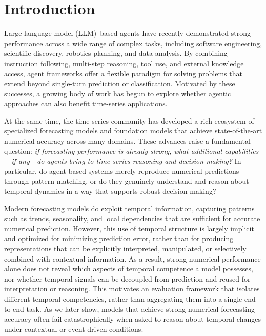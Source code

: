 \section{Introduction}


Large language model (LLM)--based agents have recently demonstrated strong performance across a wide range of complex tasks, including software engineering, scientific discovery, robotics planning, and data analysis\cite{plaat2025agentic, jimenez2023swe, boiko2023emergent, singh2024malmm}. By combining instruction following, multi-step reasoning, tool use, and external knowledge access, agent frameworks offer a flexible paradigm for solving problems that extend beyond single-turn prediction or classification. Motivated by these successes, a growing body of work has begun to explore whether agentic approaches can also benefit time-series applications\cite{zhao2025timeseriesscientist, zhang2024large, yeh2025empowering}.

At the same time, the time-series community has developed a rich ecosystem of specialized forecasting models and foundation models that achieve state-of-the-art numerical accuracy across many domains\cite{cao2025timedit, ansari2024chronos, yang2025foundation, cao2023tempo}. These advances raise a fundamental question: \textit{if forecasting performance is already strong, what additional capabilities—if any—do agents bring to time-series reasoning and decision-making?} In particular, do agent-based systems merely reproduce numerical predictions through pattern matching, or do they genuinely understand and reason about temporal dynamics in a way that supports robust decision-making\cite{chang2025survey, chow2024towards,liu2025ts}?

Modern forecasting models do exploit temporal information, capturing patterns such as trends, seasonality, and local dependencies that are sufficient for accurate numerical prediction\cite{song2024deep, liu2024deep}.
However, this use of temporal structure is largely implicit and optimized for minimizing prediction error, rather than for producing representations that can be explicitly interpreted, manipulated, or selectively combined with contextual information.
As a result, strong numerical performance alone does not reveal which aspects of temporal competence a model possesses, nor whether temporal signals can be decoupled from prediction and reused for interpretation or reasoning.
This motivates an evaluation framework that isolates different temporal competencies, rather than aggregating them into a single end-to-end task. As we later show, models that achieve strong numerical forecasting accuracy often fail catastrophically when asked to reason about temporal changes under contextual or event-driven conditions.


